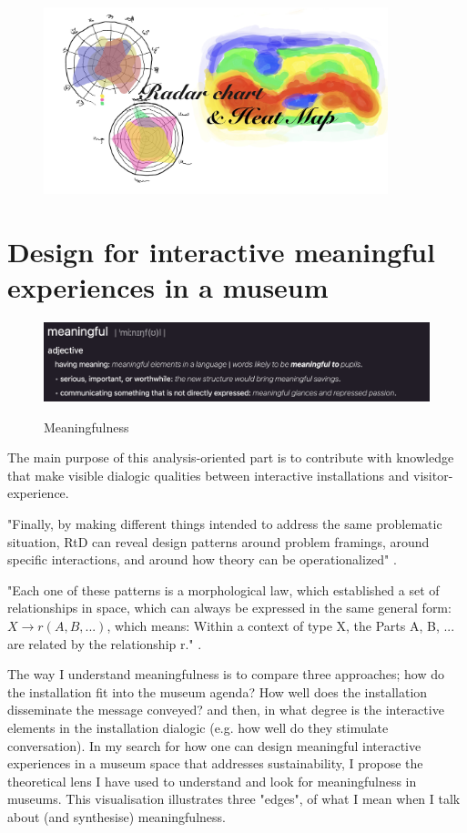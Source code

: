 \begin{figure}[H]
\centering 
\includegraphics[width=10cm]{pictures/Theory/radar_and_heatmap.jpeg}
\caption{}
\end{figure}




\section{Design for interactive meaningful experiences in a museum}

\begin{figure}[H]
\includegraphics[width=12.5cm]{pictures/background/meaningful.png}
\caption{Meaningfulness}{\autocite{Oxford_dictionary}}
\centering
\end{figure}

The main purpose of this analysis-oriented part is to contribute with knowledge that make visible dialogic qualities between interactive installations and visitor-experience. 

"Finally, by making different things intended to address the same problematic situation, RtD can reveal design patterns \autocite{Alexander_book} around problem framings, around specific interactions, and around how theory can be operationalized" \autocite[p. 178]{zimmerman_research_2014}.


"Each one of these patterns is a morphological law, which established a set of relationships in space, which can always be expressed in the same general form: $X \rightarrow r (A, B, ...)$, which means: Within a context of type X, the Parts A, B, ... are related by the relationship r." \autocite[p. 90]{Alexander_book}.


The way I understand meaningfulness is to compare three approaches; how do the installation fit into the museum agenda? How well does the installation disseminate the message conveyed? and then, in what degree is the interactive elements in the installation dialogic (e.g. how well do they stimulate conversation). In my search for how one can design meaningful interactive experiences in a museum space that addresses sustainability, I propose the theoretical lens I have used to understand and look for meaningfulness in museums. This visualisation illustrates three "edges", of what I mean when I talk about (and synthesise) meaningfulness. 


